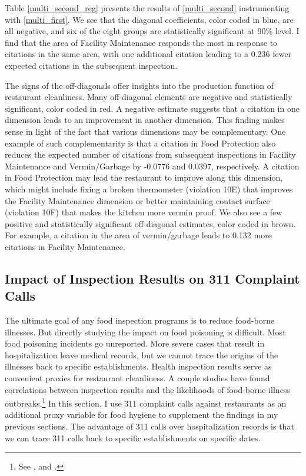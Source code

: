 \documentclass[12pt]{article}
\begin{document}
Table \ref{multi_second_reg} presents the results of \eqref{multi_second} instrumenting with \eqref{multi_first}. We see that the diagonal coefficients, color coded in blue, are all negative, and six of the eight groups are statistically significant at 90\% level. I find that the area of Facility Maintenance responds the most in response to citations in the same area, with one additional citation leading to a 0.236 fewer expected citations in the subsequent inspection. 

The signs of the off-diagonals offer insights into the production function of restaurant cleanliness. Many off-diagonal elements are negative and statistically significant, color coded in red. A negative estimate suggests that a citation in one dimension leads to an improvement in another dimension. This finding makes sense in light of the fact that various dimensions may be complementary. One example of such complementarity is that a citation in Food Protection also reduces the expected number of citations from subsequent inspections in Facility Maintenance and Vermin/Garbage by -0.0776 and 0.0397, respectively. A citation in Food Protection may lead the restaurant to improve along this dimension, which might include fixing a broken thermometer (violation 10E) that improves the Facility Maintenance dimension or better maintaining contact surface (violation 10F) that makes the kitchen more vermin proof. We also see a few positive and statistically significant off-diagonal estimates, color coded in brown. For example, a citation in the area of vermin/garbage leads to 0.132 more citations in Facility Maintenance. 

\subsection{Impact of Inspection Results on 311 Complaint Calls}
\label{complaints_analysis}
The ultimate goal of any food inspection programs is to reduce food-borne illnesses. But directly studying the impact on food poisoning is difficult. Most food poisoning incidents go unreported. More severe cases that result in hospitalization leave medical records, but we cannot trace the origins of the illnesses back to specific establishments. Health inspection results serve as convenient proxies for restaurant cleanliness. A couple studies have found correlations between inspection results and the likelihoods of food-borne illness outbreaks.\footnote{See \cite{Irwin_89}, \cite{petran_12} and \cite{petran_12_a}.} In this section, I use 311 complaint calls against restaurants as an additional proxy variable for food hygiene to supplement the findings in my previous sections. The advantage of 311 calls over hospitalization records is that we can trace 311 calls back to specific establishments on specific dates.
\end{document}
